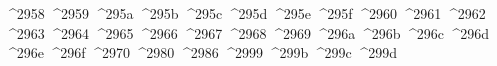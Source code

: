 {  ^^^^2958%
  ^^^^2959%
  ^^^^295a%
  ^^^^295b%
  ^^^^295c%
  ^^^^295d%
  ^^^^295e%
  ^^^^295f%
  ^^^^2960%
  ^^^^2961%
  ^^^^2962%
  ^^^^2963%
  ^^^^2964%
  ^^^^2965%
  ^^^^2966%
  ^^^^2967%
  ^^^^2968%
  ^^^^2969%
  ^^^^296a%
  ^^^^296b%
  ^^^^296c%
  ^^^^296d%
  ^^^^296e%
  ^^^^296f%
  ^^^^2970%
  ^^^^2980%
  ^^^^2986%
  ^^^^2999%
  ^^^^299b%
  ^^^^299c%
  ^^^^299d%
}
